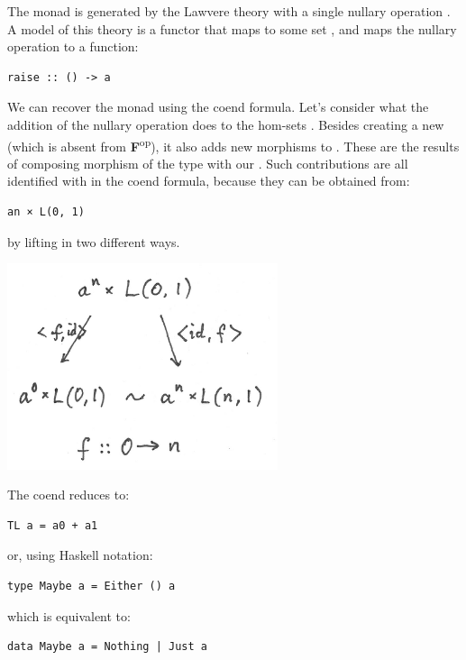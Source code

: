 The  monad is generated by the Lawvere theory with a
single nullary operation . A model of this
theory is a functor that maps  to some set , and
maps the nullary operation to a function:

\begin{verbatim}
raise :: () -> a
\end{verbatim}

We can recover the  monad using the coend formula. Let's
consider what the addition of the nullary operation does to the hom-sets
. Besides creating a new  (which is
absent from \textbf{F}\textsuperscript{op}), it also adds new morphisms
to . These are the results of composing morphism of the
type  with our .
Such contributions are all identified with  in
the coend formula, because they can be obtained from:

\begin{verbatim}
an × L(0, 1)
\end{verbatim}

by lifting  in two different ways.

\includegraphics[width=3.12500in]{images/equalize2.png}

The coend reduces to:

\begin{verbatim}
TL a = a0 + a1
\end{verbatim}

or, using Haskell notation:

\begin{verbatim}
type Maybe a = Either () a
\end{verbatim}

which is equivalent to:

\begin{verbatim}
data Maybe a = Nothing | Just a
\end{verbatim}

